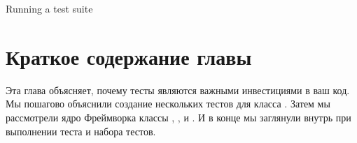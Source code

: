 \documentclass[a4paper,10pt,twoside]{book}
\begin{document}
\begin{method}[testsuiterun]{Running a test suite}



\section{Краткое содержание главы}

Эта глава объясняет, почему тесты являются важными инвестициями в ваш код.
Мы пошагово объяснили создание нескольких тестов для класса .
Затем мы рассмотрели ядро Фреймворка \sunit классы ,
,  и .
И в конце мы заглянули внутрь \sunit при выполнении теста и набора тестов.


\end{method}
\end{document}
